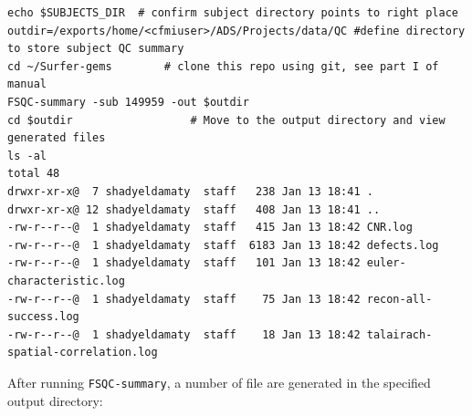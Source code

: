 \documentclass[paper=a4, fontsize=11pt]{scrartcl} %
\numberwithin{equation}{section} %
\numberwithin{figure}{section} %
\numberwithin{table}{section} %
\begin{document}
\begin{lstlisting}
echo $SUBJECTS_DIR 	# confirm subject directory points to right place
outdir=/exports/home/<cfmiuser>/ADS/Projects/data/QC #define directory to store subject QC summary
cd ~/Surfer-gems		# clone this repo using git, see part I of manual
FSQC-summary -sub 149959 -out $outdir
cd $outdir 					# Move to the output directory and view generated files
ls -al
total 48
drwxr-xr-x@  7 shadyeldamaty  staff   238 Jan 13 18:41 .
drwxr-xr-x@ 12 shadyeldamaty  staff   408 Jan 13 18:41 ..
-rw-r--r--@  1 shadyeldamaty  staff   415 Jan 13 18:42 CNR.log
-rw-r--r--@  1 shadyeldamaty  staff  6183 Jan 13 18:42 defects.log
-rw-r--r--@  1 shadyeldamaty  staff   101 Jan 13 18:42 euler-characteristic.log
-rw-r--r--@  1 shadyeldamaty  staff    75 Jan 13 18:42 recon-all-success.log
-rw-r--r--@  1 shadyeldamaty  staff    18 Jan 13 18:42 talairach-spatial-correlation.log
\end{lstlisting}
\lstset{escapechar=\@} %

After running \texttt{FSQC-summary}, a number of file are generated in the specified output directory:
\end{document}
